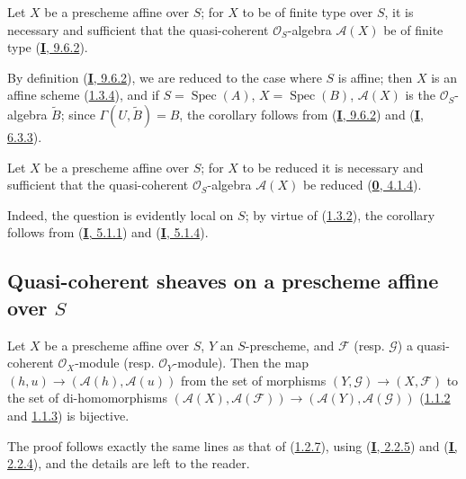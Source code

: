 \begin{corollary}[1.3.7]
\label{II.1.3.7}
Let $X$ be a prescheme affine over $S$; for $X$ to be of finite type
over $S$, it is necessary and sufficient that the quasi-coherent
$\mathcal{O}_S$-algebra $\mathcal{A}(X)$ be of finite type
\textup{(\hyperref[I.9.6.2]{\textbf{I}, 9.6.2})}.
\end{corollary}

By definition (\hyperref[I.9.6.2]{\textbf{I}, 9.6.2}), we are reduced to the case
where $S$ is affine; then $X$ is an affine scheme
(\hyperref[II.1.3.4]{1.3.4}), and if $S=\operatorname{Spec}(A)$,
$X=\operatorname{Spec}(B)$, $\mathcal{A}(X)$ is the
$\mathcal{O}_S$-algebra $\widetilde{B}$; since
$\Gamma(U,\widetilde{B})=B$, the corollary follows from
(\hyperref[I.9.6.2]{\textbf{I}, 9.6.2}) and
(\hyperref[I.6.3.3]{\textbf{I}, 6.3.3}).

\begin{corollary}[1.3.8]
\label{II.1.3.8}
Let $X$ be a prescheme affine over $S$; for $X$ to be reduced it is
necessary and sufficient that the quasi-coherent $\mathcal{O}_S$-algebra
$\mathcal{A}(X)$ be reduced
\textup{(\hyperref[0.4.1.4]{\textbf{0}, 4.1.4})}.
\end{corollary}

Indeed, the question is evidently local on $S$; by virtue of
(\hyperref[II.1.3.2]{1.3.2}), the corollary follows from
(\hyperref[I.5.1.1]{\textbf{I}, 5.1.1}) and
(\hyperref[I.5.1.4]{\textbf{I}, 5.1.4}).

\subsection{Quasi-coherent sheaves on a prescheme affine over
$S$}
\label{subsection:II.1.4}

\begin{proposition}[1.4.1]
\label{II.1.4.1}
Let $X$ be a prescheme affine over $S$, $Y$ an $S$-prescheme, and
$\mathcal{F}$ \textup{(resp. $\mathcal{G}$)} a quasi-coherent $\mathcal{O}_X$-module
\textup{(resp.} $\mathcal{O}_Y$-module\textup{)}. Then the map
$(h,u)\to(\mathcal{A}(h),\mathcal{A}(u))$ from the set of morphisms
$(Y,\mathcal{G})\to(X,\mathcal{F})$ to the set of di-homomorphisms
$(\mathcal{A}(X),\mathcal{A}(\mathcal{F}))\to
(\mathcal{A}(Y),\mathcal{A}(\mathcal{G}))$
\textup{(\hyperref[II.1.1.2]{1.1.2} and
\hyperref[II.1.1.3]{1.1.3})} is bijective.
\end{proposition}

The proof follows exactly the same lines as that of
(\hyperref[II.1.2.7]{1.2.7}), using
(\hyperref[I.2.2.5]{\textbf{I}, 2.2.5}) and
(\hyperref[I.2.2.4]{\textbf{I}, 2.2.4}), and the details are left to the
reader.

